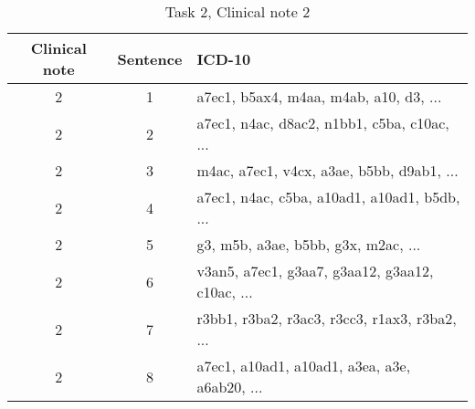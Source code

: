 \begin{table}[htbp] \footnotesize \center
\caption{Task 2, Clinical note 2 \label{tab:t2c2}}
\begin{tabularx}{\textwidth}{c c X}
    \toprule
    Clinical note & Sentence & ICD-10 \\
    \midrule
	 2 & 1 & a7ec1, b5ax4, m4aa, m4ab, a10, d3, ... \\
	 2 & 2 & a7ec1, n4ac, d8ac2, n1bb1, c5ba, c10ac, ... \\
	 2 & 3 & m4ac, a7ec1, v4cx, a3ae, b5bb, d9ab1, ... \\
	 2 & 4 & a7ec1, n4ac, c5ba, a10ad1, a10ad1, b5db, ... \\
	 2 & 5 & g3, m5b, a3ae, b5bb, g3x, m2ac, ... \\
	 2 & 6 & v3an5, a7ec1, g3aa7, g3aa12, g3aa12, c10ac, ... \\
	 2 & 7 & r3bb1, r3ba2, r3ac3, r3cc3, r1ax3, r3ba2, ... \\
	 2 & 8 & a7ec1, a10ad1, a10ad1, a3ea, a3e, a6ab20, ... \\
	\bottomrule
\end{tabularx}
\end{table}